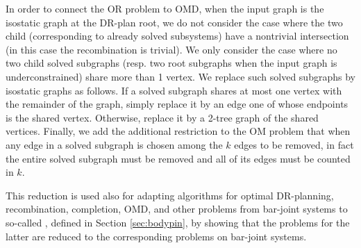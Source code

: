 In order to connect the OR problem to OMD, when the input graph is the isostatic graph at the DR-plan root, we do not consider the case where the two child  (corresponding to already solved subsystems) have a nontrivial intersection (in this case the recombination is trivial). We only consider the case where no two child solved subgraphs (resp. two root subgraphs when the input graph is underconstrained) share more than 1 vertex. We replace such solved subgraphs  by isostatic graphs as follows. If a solved subgraph shares at most one vertex with the remainder of the graph, simply replace it by an edge one of whose endpoints  is the shared vertex. Otherwise, replace it by  a 2-tree graph of the shared vertices. Finally, we add the additional restriction to the OM problem that when any edge in a solved subgraph is chosen among the $k$ edges to be removed, in fact the entire solved subgraph must be removed  and all of its edges must be counted in $k$.

This reduction is used also for adapting  algorithms for optimal DR-planning, recombination, completion, OMD, and other problems from bar-joint systems to so-called , defined in Section \ref{sec:bodypin}, by showing that the problems for the latter are reduced to the corresponding problems on bar-joint systems.

